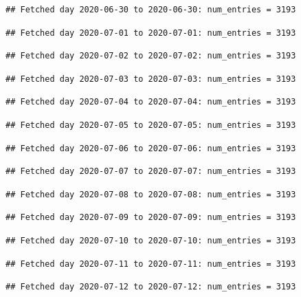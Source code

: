 \documentclass[]{article}
\begin{document}
\begin{verbatim}
## Fetched day 2020-06-30 to 2020-06-30: num_entries = 3193
\end{verbatim}

\begin{verbatim}
## Fetched day 2020-07-01 to 2020-07-01: num_entries = 3193
\end{verbatim}

\begin{verbatim}
## Fetched day 2020-07-02 to 2020-07-02: num_entries = 3193
\end{verbatim}

\begin{verbatim}
## Fetched day 2020-07-03 to 2020-07-03: num_entries = 3193
\end{verbatim}

\begin{verbatim}
## Fetched day 2020-07-04 to 2020-07-04: num_entries = 3193
\end{verbatim}

\begin{verbatim}
## Fetched day 2020-07-05 to 2020-07-05: num_entries = 3193
\end{verbatim}

\begin{verbatim}
## Fetched day 2020-07-06 to 2020-07-06: num_entries = 3193
\end{verbatim}

\begin{verbatim}
## Fetched day 2020-07-07 to 2020-07-07: num_entries = 3193
\end{verbatim}

\begin{verbatim}
## Fetched day 2020-07-08 to 2020-07-08: num_entries = 3193
\end{verbatim}

\begin{verbatim}
## Fetched day 2020-07-09 to 2020-07-09: num_entries = 3193
\end{verbatim}

\begin{verbatim}
## Fetched day 2020-07-10 to 2020-07-10: num_entries = 3193
\end{verbatim}

\begin{verbatim}
## Fetched day 2020-07-11 to 2020-07-11: num_entries = 3193
\end{verbatim}

\begin{verbatim}
## Fetched day 2020-07-12 to 2020-07-12: num_entries = 3193
\end{verbatim}
\end{document}
